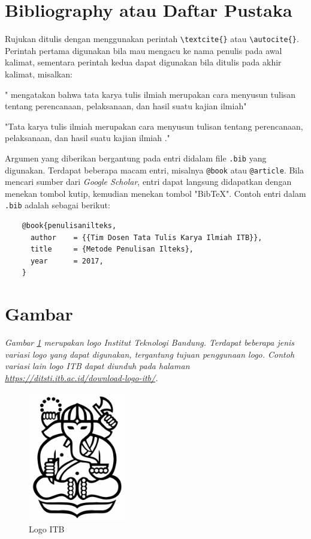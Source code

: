 \section{Bibliography atau Daftar Pustaka}

Rujukan ditulis dengan menggunakan perintah \verb|\textcite{}| atau  \verb|\autocite{}|. Perintah pertama digunakan bila mau mengacu ke nama penulis pada awal kalimat, sementara perintah kedua dapat digunakan bila ditulis pada akhir kalimat, misalkan: 

\begin{displayquote}
    "\textcite{penulisanilteks} mengatakan bahwa tata karya tulis ilmiah merupakan cara menyusun tulisan tentang perencanaan, pelaksanaan, dan hasil suatu kajian ilmiah"
    
    "Tata karya tulis ilmiah merupakan cara menyusun tulisan tentang perencanaan, pelaksanaan, dan hasil suatu kajian ilmiah \autocite{penulisanilteks}."
\end{displayquote}

Argumen yang diberikan bergantung pada entri didalam file \texttt{.bib} yang digunakan. Terdapat beberapa macam entri, misalnya \verb|@book| atau \verb|@article|. Bila mencari sumber dari \textit{Google Scholar}, entri dapat langsung didapatkan dengan menekan tombol kutip, kemudian menekan tombol "BibTeX". Contoh entri dalam \texttt{.bib} adalah sebagai berikut:

\begin{verbatim}
    @book{penulisanilteks,
      author    = {{Tim Dosen Tata Tulis Karya Ilmiah ITB}}, 
      title     = {Metode Penulisan Ilteks},
      year      = 2017,
    }
\end{verbatim}

\section{Gambar}

\textit{Gambar \ref{gambar:logo_itb} merupakan logo Institut Teknologi Bandung. Terdapat beberapa jenis variasi logo yang dapat digunakan, tergantung tujuan penggunaan logo. Contoh variasi lain logo ITB dapat diunduh pada halaman \url{https://ditsti.itb.ac.id/download-logo-itb/}.}

\begin{figure}[h]
    \centering
  	\includegraphics[width=0.38\textwidth]{aset/logo-itb.jpg}
  	\caption{Logo ITB}
  	\label{gambar:logo_itb}
\end{figure}

